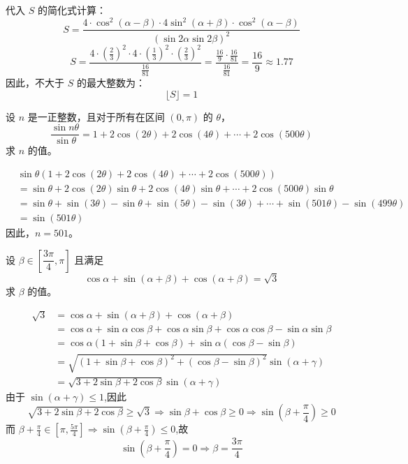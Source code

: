 \begin{questions}
\begin{solution}
代入 $S$ 的简化式计算：
\[
S = \frac{4 \cdot \cos^2(\alpha - \beta) \cdot 4 \sin^2(\alpha + \beta) \cdot \cos^2(\alpha - \beta)}{(\sin 2\alpha \sin 2\beta)^2}
\]
\[
S = \frac{4 \cdot (\frac{2}{3})^2 \cdot 4 \cdot (\frac{1}{3})^2 \cdot (\frac{2}{3})^2}{\frac{16}{81}} = \frac{\frac{16}{9} \cdot \frac{16}{81}}{\frac{16}{81}} = \frac{16}{9} \approx 1.77
\]
因此，不大于 $S$ 的最大整数为：
\[
\lfloor S \rfloor = 1
\]
\end{solution}

    \question 设 $n$ 是一正整数，且对于所有在区间 $(0, \pi)$ 的 $\theta$，
\[
\frac{\sin n\theta}{\sin \theta} = 1 + 2\cos(2\theta) + 2\cos(4\theta) + \cdots + 2\cos(500\theta)
\]
求 $n$ 的值。

\begin{solution}
\begin{align*}
&\sin \theta (1 + 2\cos(2\theta) + 2\cos(4\theta) + \cdots + 2\cos(500\theta)) \\
&= \sin \theta + 2\cos(2\theta)\sin \theta + 2\cos(4\theta)\sin \theta + \cdots + 2\cos(500\theta)\sin \theta \\
&= \sin \theta + \sin(3\theta) - \sin \theta + \sin(5\theta) - \sin(3\theta) + \cdots + \sin(501\theta) - \sin(499\theta) \\
&= \sin(501\theta)
\end{align*}
因此，$n = 501$。
\end{solution}

    \question 设 $\beta \in \left[\dfrac{3\pi}{4}, \pi\right]$ 且满足
    \[
    \cos\alpha + \sin(\alpha+\beta) + \cos(\alpha+\beta) = \sqrt{3}
    \]
    求 $\beta$ 的值。
    \begin{solution}
        \begin{align*}
        \sqrt{3} &= \cos\alpha + \sin(\alpha+\beta) + \cos(\alpha+\beta)\\
        &= \cos\alpha + \sin\alpha \cos\beta + \cos\alpha \sin\beta + \cos\alpha \cos\beta - \sin\alpha \sin\beta \\
        &= \cos\alpha(1 + \sin\beta + \cos\beta) + \sin\alpha(\cos\beta - \sin\beta) \\
        &= \sqrt{(1 + \sin\beta + \cos\beta)^2 + (\cos\beta - \sin\beta)^2} \sin(\alpha + \gamma)\\
        &= \sqrt{3 + 2\sin\beta + 2\cos\beta}\sin(\alpha + \gamma)
        \end{align*}
        由于 $\sin(\alpha + \gamma) \le 1$,因此
        \[
        \sqrt{3 + 2\sin\beta + 2\cos\beta} \ge \sqrt3 \Rightarrow \sin\beta + \cos\beta \ge 0 \Rightarrow \sin\left(\beta + \frac{\pi}{4}\right) \ge 0
        \]
        而 $\beta + \frac{\pi}{4} \in [\pi, \frac{5\pi}{4}]\Rightarrow \sin\left(\beta + \frac{\pi}{4}\right) \le 0$,故
        \[
        \sin\left(\beta + \frac{\pi}{4}\right)=0 \Rightarrow \beta=\dfrac{3\pi}{4}
        \]
    \end{solution}


\end{questions}
